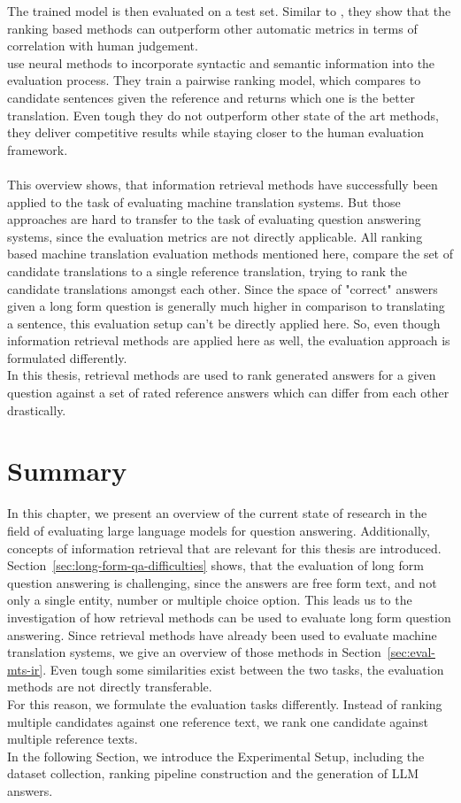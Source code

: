The trained model is then evaluated on a test set.
Similar to \cite{duh:2008}, they show that the ranking based methods can outperform other automatic metrics in terms of correlation with human judgement.
\\
\cite{guzman:2019} use neural methods to incorporate syntactic and semantic information into the evaluation process.
They train a pairwise ranking model, which compares to candidate sentences given the reference and returns which one is the better translation.
Even tough they do not outperform other state of the art methods, they deliver competitive results while staying closer to the human evaluation framework.
\\
\\
This overview shows, that information retrieval methods have successfully been applied to the task of evaluating machine translation systems.
But those approaches are hard to transfer to the task of evaluating question answering systems, since the evaluation metrics are not directly applicable.
All ranking based machine translation evaluation methods mentioned here, compare the set of candidate translations to a single reference translation, trying to rank the candidate translations amongst each other.
Since the space of "correct" answers given a long form question is generally much higher in comparison to translating a sentence, this evaluation setup can't be directly applied here.
So, even though information retrieval methods are applied here as well, the evaluation approach is formulated differently.
\\
In this thesis, retrieval methods are used to rank generated answers for a given question against a set of rated reference answers which can differ from each other drastically.

\section{Summary}
In this chapter, we present an overview of the current state of research in the field of evaluating large language models for question answering.
Additionally, concepts of information retrieval that are relevant for this thesis are introduced.
\\
Section~\ref{sec:long-form-qa-difficulties} shows, that the evaluation of long form question answering is challenging, since the answers are free form text, and not only a single entity, number or multiple choice option.
This leads us to the investigation of how retrieval methods can be used to evaluate long form question answering.
Since retrieval methods have already been used to evaluate machine translation systems, we give an overview of those methods in Section~\ref{sec:eval-mts-ir}.
Even tough some similarities exist between the two tasks, the evaluation methods are not directly transferable.
\\
For this reason, we formulate the evaluation tasks differently.
Instead of ranking multiple candidates against one reference text, we rank one candidate against multiple reference texts.
\\
In the following Section, we introduce the Experimental Setup, including the dataset collection, ranking pipeline construction and the generation of LLM answers.
